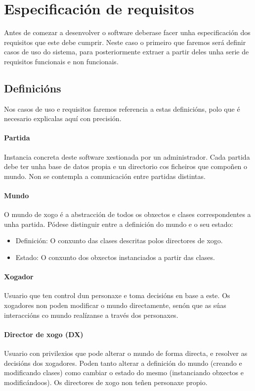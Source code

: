 \chapter{Especificación de requisitos}

Antes de comezar a desenvolver o software deberase facer unha especificación dos
requisitos que este debe cumprir. Neste caso o primeiro que faremos será definir
casos de uso do sistema, para posteriormente extraer a partir deles unha serie
de requisitos funcionais e non funcionais.

\section{Definicións}
Nos casos de uso e requisitos faremos referencia a estas definicións, polo que é
necesario explicalas aquí con precisión.

\subsubsection{Partida}
Instancia concreta deste software xestionada por un administrador. Cada partida
debe ter unha base de datos propia e un directorio cos ficheiros que compoñen o
mundo. Non se contempla a comunicación entre partidas distintas.

\subsubsection{Mundo}
O mundo de xogo é a abstracción de todos os obxectos e clases correspondentes a
unha partida. Pódese distinguir entre a definición do mundo e o seu estado:
\begin{itemize}
\item Definición: O conxunto das clases descritas polos directores de xogo.
\item Estado: O conxunto dos obxectos instanciados a partir das clases.
\end{itemize}

\subsubsection{Xogador}
Usuario que ten control dun personaxe e toma decisións en base a este. Os
xogadores non poden modificar o mundo directamente, senón que as súas
interaccións co mundo realízanse a través dos personaxes.

\subsubsection{Director de xogo (DX)}
Usuario con privilexios que pode alterar o mundo de forma directa, e resolver as
decisións dos xogadores. Poden tanto alterar a definición do mundo (creando e
modificando clases) como cambiar o estado do mesmo (instanciando obxectos e
modificándoos). Os directores de xogo non teñen personaxe propio.


